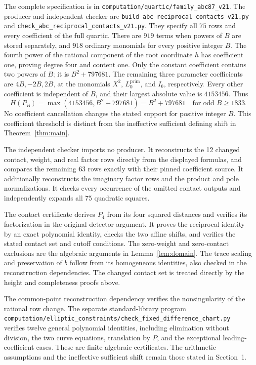 \documentclass[11pt,a4paper]{article}
\begin{document}
The complete specification is in
\nolinkurl{computation/quartic/family_abc87_v21}. The producer and
independent checker are
\nolinkurl{build_abc_reciprocal_contacts_v21.py} and
\nolinkurl{check_abc_reciprocal_contacts_v21.py}. They specify all $75$ rows
and every coefficient of the full quartic. There are $919$ terms when
powers of $B$ are stored separately, and $918$ ordinary monomials for
every positive integer $B$. The fourth power of the rational component
of the root coordinate $h$ has coefficient one, proving degree four
and content one. Only the constant coefficient contains two powers of
$B$; it is $B^2+797681$. The remaining three parameter coefficients
are $4B,-2B,2B$, at the monomials $X^2$, $L_0^{\mathrm{prim}}$,
and $I_0$, respectively. Every other coefficient is independent of
$B$, and their largest absolute value is $4153456$. Thus
\[
 H(P_B)=\max(4153456,B^2+797681)
       =B^2+797681\quad\text{for odd }B\ge1833.
\]
No coefficient cancellation changes the stated support for positive
integer $B$. This coefficient threshold is distinct from the
ineffective sufficient defining shift in Theorem~\ref{thm:main}.

The independent checker imports no producer. It reconstructs the
12 changed contact, weight, and real factor rows directly from the
displayed formulas, and compares the remaining 63 rows exactly with
their pinned coefficient source. It additionally reconstructs the
imaginary factor rows and the product and pole normalizations.
It checks every occurrence of the omitted contact outputs and
independently expands all 75 quadratic squares.

The contact certificate derives $P_4$ from its four squared distances
and verifies its factorization in the original detector argument.
It proves the reciprocal identity by an exact polynomial identity,
checks the two affine shifts, and verifies the stated contact set
and cutoff conditions. The zero-weight and zero-contact exclusions
are the algebraic arguments in Lemma~\ref{lem:domain}. The trace
scaling and preservation of $b$ follow from its homogeneous identities,
also checked in the reconstruction dependencies. The changed contact
set is treated directly by the height and completeness proofs above.

The common-point reconstruction dependency verifies the nonsingularity
of the rational row change. The separate standard-library program
\nolinkurl{computation/elliptic_constraints/check_fixed_difference_chart.py}
verifies twelve general polynomial identities, including elimination
without division, the two curve equations, translation by $P$, and the
exceptional leading-coefficient cases. These are finite algebraic
certificates. The arithmetic assumptions and the ineffective sufficient
shift remain those stated in Section~1.
\end{document}

